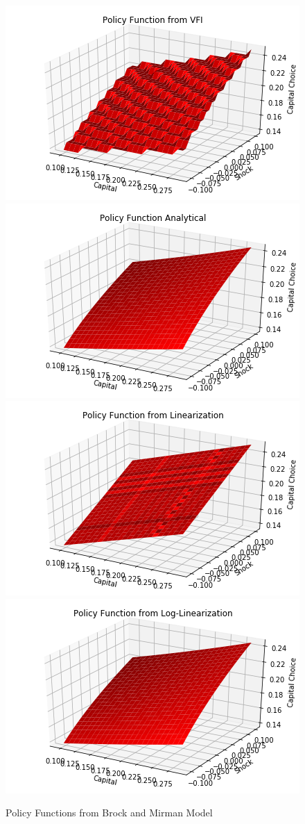 \documentclass{article}
\begin{document}
	\begin{figure}[!h]
		\centering
		\caption{Policy Functions from Brock and Mirman Model}
		\includegraphics[scale = 0.5]{fig1}
		\includegraphics[scale = 0.5]{fig2}
		\includegraphics[scale = 0.5]{fig3}
		\includegraphics[scale = 0.5]{fig4}
	\end{figure}
\end{document}
